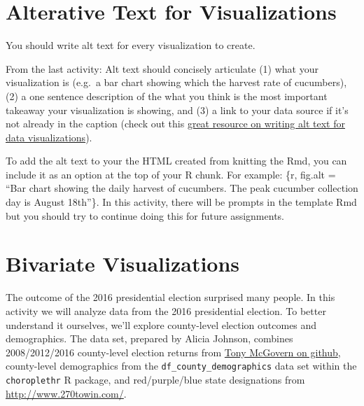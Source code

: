 \documentclass[
  letterpaper,
  DIV=11,
  numbers=noendperiod]{scrreprt}
\begin{document}
\section*{Alterative Text for
Visualizations}\label{alterative-text-for-visualizations}


You should write alt text for every visualization to create.

From the last activity: Alt text should concisely articulate (1) what
your visualization is (e.g.~a bar chart showing which the harvest rate
of cucumbers), (2) a one sentence description of the what you think is
the most important takeaway your visualization is showing, and (3) a
link to your data source if it's not already in the caption (check out
this
\href{https://medium.com/nightingale/writing-alt-text-for-data-visualization-2a218ef43f81}{great
resource on writing alt text for data visualizations}).

To add the alt text to your the HTML created from knitting the Rmd, you
can include it as an option at the top of your R chunk. For example:
\{r, fig.alt = ``Bar chart showing the daily harvest of cucumbers. The
peak cucumber collection day is August 18th''\}. In this activity, there
will be prompts in the template Rmd but you should try to continue doing
this for future assignments.

\section*{Bivariate Visualizations}\label{bivariate-visualizations-1}


The outcome of the 2016 presidential election surprised many people. In
this activity we will analyze data from the 2016 presidential election.
To better understand it ourselves, we'll explore county-level election
outcomes and demographics. The data set, prepared by Alicia Johnson,
combines 2008/2012/2016 county-level election returns from
\href{https://github.com/tonmcg/County_Level_Election_Results_12-16}{Tony
McGovern on github}, county-level demographics from the
\texttt{df\_county\_demographics} data set within the
\texttt{choroplethr} R package, and red/purple/blue state designations
from \url{http://www.270towin.com/}.
\end{document}

